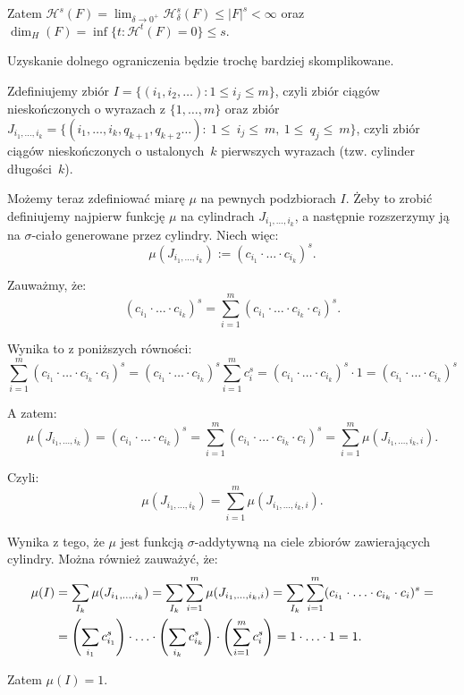 \documentclass{mini}
\begin{document}
\begin{dow}
Zatem $\displaystyle\mathcal{H}^s(F)=\lim_{\delta\rightarrow 0^+}\mathcal{H}^s_{\delta}(F)\leqslant|F|^s<\infty$ oraz $\displaystyle\dim_H(F)=\inf\lbrace t: \mathcal{H}^t(F)=0\rbrace \leqslant s$. 

Uzyskanie dolnego ograniczenia będzie trochę bardziej skomplikowane.

Zdefiniujemy zbiór $I = \lbrace (i_1 , i_2 , \ldots ): 1 \leqslant i_j \leqslant m \rbrace $, czyli zbiór ciągów nieskończonych o wyrazach z $ \lbrace 1 , \ldots , m \rbrace $ oraz zbiór $J_{i_1 , \ldots , i_k}=\lbrace(i_1 ,\ldots,i_k,q_{k+1},q_{k+2} \ldots):~1\leqslant~i_j\leqslant~m,~1\leqslant~q_j\leqslant~m\rbrace$, czyli zbiór ciągów nieskończonych o ustalonych~$k$ pierwszych wyrazach (tzw. cylinder długości~$k$).

Możemy teraz zdefiniować miarę $\mu$ na pewnych podzbiorach $I$. Żeby to zrobić definiujemy najpierw funkcję $\mu$ na cylindrach $J_{i_1, \ldots , i_k}$, a następnie rozszerzymy ją na $\sigma$-ciało generowane przez cylindry. Niech więc:
$$
\mu ( J_{i_1, \ldots , i_k} ) := (c_{i_1} \cdot \ldots \cdot c_{i_k})^s .
$$

Zauważmy, że: 
$$ 
(c_{i_1} \cdot \ldots \cdot c_{i_k})^s = \sum^m_{i=1} (c_{i_1} \cdot \ldots \cdot c_{i_k} \cdot c_i)^s.
$$ 

Wynika to z poniższych równości:
$$ 
\sum^m_{i=1} (c_{i_1} \cdot \ldots \cdot c_{i_k} \cdot c_i)^s = (c_{i_1} \cdot \ldots \cdot c_{i_k})^s \sum^m_{i=1} c_i^s = (c_{i_1} \cdot \ldots \cdot c_{i_k})^s \cdot 1 = (c_{i_1} \cdot \ldots \cdot c_{i_k})^s 
$$

A zatem:
$$ 
\mu ( J_{i_1, \ldots , i_k} ) = (c_{i_1} \cdot \ldots \cdot c_{i_k})^s = \sum^m_{i=1} (c_{i_1} \cdot \ldots \cdot c_{i_k} \cdot c_i)^s = \sum^m_{i=1} \mu (J_{i_1, \ldots , i_k,i}).
$$

Czyli:
$$ 
\mu ( J_{i_1, \ldots , i_k} ) = \sum^m_{i=1} \mu (J_{i_1, \ldots , i_k,i}).
$$

Wynika z tego, że $\mu$ jest funkcją $\sigma$-addytywną na ciele zbiorów zawierających cylindry. Można również zauważyć, że:
$$ 
\aligned 
\mu (I) &= \sum_{I_k} \mu ( J_{i_1, \ldots , i_k} ) = \sum_{I_k} \sum^m_{i=1} \mu (J_{i_1, \ldots , i_k,i}) = \sum_{I_k} \sum^m_{i=1} (c_{i_1} \cdot \ldots \cdot c_{i_k} \cdot c_i)^s =\\
&= \left( \sum_{i_1} c_{i_1}^s \right) \cdot \ldots \cdot \left( \sum_{i_k} c_{i_k}^s \right) \cdot \left( \sum^{m}_{i=1} c_{i}^s \right) = 1 \cdot \ldots \cdot 1 = 1.
\endaligned 
$$

Zatem $\mu ( I ) = 1$. 


\end{dow}
\end{document}
